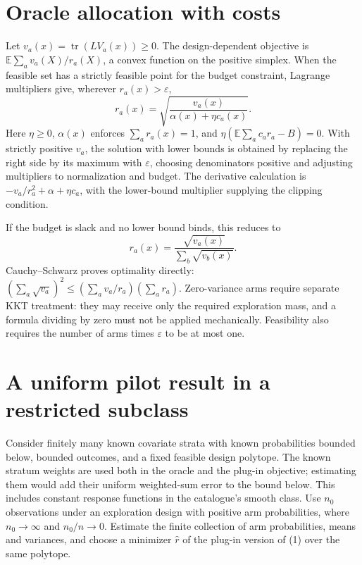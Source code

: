 \documentclass[11pt]{article}
\newcommand{\E}{\mathbb E}
\begin{document}
\section*{Oracle allocation with costs}
Let $v_a(x)=\operatorname{tr}(LV_a(x))\geq0$. The design-dependent objective is $\E\sum_av_a(X)/r_a(X)$, a convex function on the positive simplex. When the feasible set has a strictly feasible point for the budget constraint, Lagrange multipliers give, wherever $r_a(x)>\varepsilon$,
\[
 r_a(x)=\sqrt{\frac{v_a(x)}{\alpha(x)+\eta c_a(x)}}. \tag{2}
\]
Here $\eta\geq0$, $\alpha(x)$ enforces $\sum_ar_a(x)=1$, and
$\eta(\E\sum_ac_ar_a-B)=0$. With strictly positive $v_a$, the solution with lower bounds is obtained by replacing the right side by its maximum with $\varepsilon$, choosing denominators positive and adjusting multipliers to normalization and budget. The derivative calculation is $-v_a/r_a^2+\alpha+\eta c_a$, with the lower-bound multiplier supplying the clipping condition.

If the budget is slack and no lower bound binds, this reduces to
\[
 r_a(x)=\frac{\sqrt{v_a(x)}}{\sum_b\sqrt{v_b(x)}}.
\]
Cauchy--Schwarz proves optimality directly: $(\sum_a\sqrt{v_a})^2\leq(\sum_av_a/r_a)(\sum_ar_a)$. Zero-variance arms require separate KKT treatment: they may receive only the required exploration mass, and a formula dividing by zero must not be applied mechanically. Feasibility also requires the number of arms times $\varepsilon$ to be at most one.

\section*{A uniform pilot result in a restricted subclass}
Consider finitely many known covariate strata with known probabilities bounded below, bounded outcomes, and a fixed feasible design polytope. The known stratum weights are used both in the oracle and the plug-in objective; estimating them would add their uniform weighted-sum error to the bound below. This includes constant response functions in the catalogue's smooth class. Use $n_0$ observations under an exploration design with positive arm probabilities, where $n_0\to\infty$ and $n_0/n\to0$. Estimate the finite collection of arm probabilities, means and variances, and choose a minimizer $\widehat r$ of the plug-in version of (1) over the same polytope.
\end{document}
